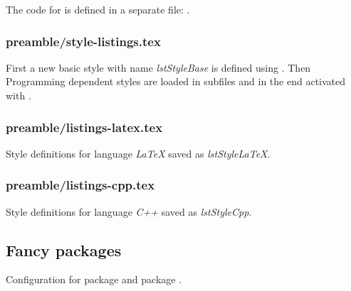 The code for  is defined in a separate file: .


\subsubsection{preamble/style-listings.tex}

First a new basic style with name \emph{lstStyleBase} is defined using . Then Programming dependent styles are loaded in subfiles and in the end activated with .


\subsubsection{preamble/listings-latex.tex}

Style definitions for language \emph{LaTeX} saved as \emph{lstStyleLaTeX}.


\subsubsection{preamble/listings-cpp.tex}

Style definitions for language \emph{C++} saved as \emph{lstStyleCpp}.



\subsection{Fancy packages}
\label{sec:style:fancy}

Configuration for package  and package .


